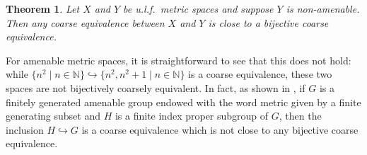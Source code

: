 \documentclass[11pt]{amsart}
\newcommand{\N}{\mathbb{N}}
\numberwithin{equation}{section}
\newtheorem{theorem}{Theorem}[section]
\theoremstyle{definition}
\theoremstyle{remark}
\numberwithin{equation}{section}
\begin{document}
\begin{theorem}\label{inab}
Let  $X$ and $Y$ be u.l.f.\ metric spaces and suppose $Y$ is non-amenable. Then any coarse equivalence between $X$ and $Y$ is close to a bijective coarse equivalence.    \label{WhyteIntro}
\end{theorem}

For amenable metric spaces, it is straightforward to see that this does not hold:  while $\{n^2\mid n\in\N\}\hookrightarrow\{n^2,n^2+1\mid n\in\N\} $ is a coarse equivalence, these two spaces are not bijectively coarsely equivalent. In fact, as shown in \cite[Theorem 3.5]{Dymarz2005ContempMath}, if $G$ is a finitely generated amenable group endowed with the word metric given by a finite generating subset and $H$ is a finite index proper subgroup of $G$, then the inclusion $H\hookrightarrow G$ is a coarse equivalence which is not close to any bijective coarse equivalence. %
 
\end{document}
